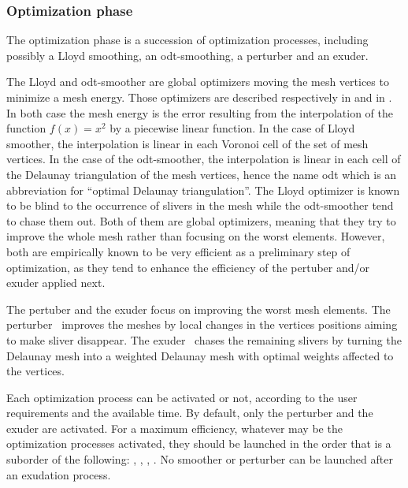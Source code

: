 \subsubsection{Optimization phase}

The optimization phase is a succession of optimization processes,
including possibly a Lloyd smoothing, an odt-smoothing,
a perturber and an exuder.

The  Lloyd and odt-smoother are global optimizers
 moving the  mesh vertices to  minimize  
a   mesh energy.   Those optimizers are described respectively in 
\cite{cgal:dfg-cvtaa-99t, cgal:dw-tmgob-02} and  in \cite{cgal::c-mssbo-04,cgal:acyd-vtm-05}.
In both case the mesh energy
is  the   error  resulting from the interpolation 
of the function $f(x) =x^2$ by a piecewise linear function. 
In the case of Lloyd smoother,
the interpolation  is  linear in each Voronoi cell of the set of  mesh vertices.
In the case of the odt-smoother,  the interpolation is linear in each cell 
of the Delaunay triangulation of the  mesh vertices,
hence the name odt which is an  abbreviation for ``optimal Delaunay triangulation''.
The Lloyd optimizer is known to be blind to the occurrence of slivers in the mesh 
while the odt-smoother tend to chase them out. Both of them are global optimizers, 
meaning that they try to improve
the whole mesh rather than focusing on the worst elements. However, both  are empirically known
to be very efficient as a preliminary step of optimization, as they tend to enhance the
efficiency of the pertuber and/or exuder applied next.

The pertuber and  the exuder focus on improving the worst mesh elements.
The perturber~\cite{cgal:tsa-ps3dd-09} improves the meshes by local changes
in  the vertices positions
aiming to make sliver disappear. The exuder~\cite{cgal:cdeft-slive-00}
chases the remaining slivers by turning the Delaunay mesh into a 
weighted Delaunay mesh with optimal weights affected to the vertices.

 Each optimization process
can be activated or not,
 according to the user requirements
and the available time. 
By default, only the perturber and  the exuder are activated.
For a maximum efficiency, whatever  may be the optimization processes activated,
they should be launched in the order that is a suborder 
of the following:
, , ,
. No smoother or perturber can be launched after an exudation process.



